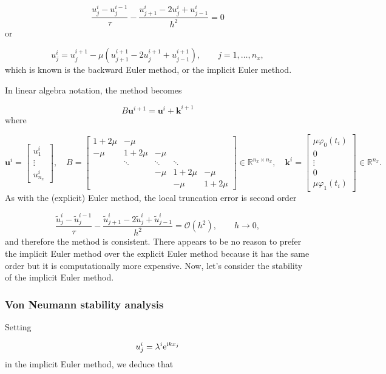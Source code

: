 \documentclass[12pt,landscape]{article}
\begin{document}
{\[
\frac{u^{i}_j - u^{i-1}_j}{\tau} - \frac{u^{i}_{j+1} - 2u^i_j + u^i_{j-1}}{h^2} = 0
\]
or

\[
u^{i}_j = u^{i+1}_j - \mu \left( u^{i+1}_{j+1} - 2u^{i+1}_j + u^{i+1}_{j-1}  \right), \qquad j = 1, \ldots, n_x,
\]
which is known is the backward Euler method, or the implicit Euler method.

In linear algebra notation, the method becomes

\[
B\mathbf{u}^{i+1} = \mathbf{u}^i + \mathbf{k}^{i+1}
\]
where

\[
\mathbf{u}^i = \begin{bmatrix}
u^{i}_{1} \\
\vdots \\
u^{i}_{n_x}
\end{bmatrix}, \quad  B = \begin{bmatrix}
1 + 2\mu & -\mu & & & \\
-\mu  & 1+2\mu & -\mu  & & \\
      & \ddots & \ddots & \ddots & \\
      &        & -\mu    & 1+ 2\mu & -\mu \\
      &        &        &-\mu      & 1+2\mu
\end{bmatrix} \in \mathbb{R}^{n_x \times n_x}, \quad \mathbf{k}^i=
\begin{bmatrix}
\mu\varphi_0(t_i) \\
0 \\
\vdots \\
0 \\
\mu \varphi_1(t_i)
\end{bmatrix} \in \mathbb{R}^{n_x}.
\]
As with the (explicit) Euler method, the local truncation error is second order

\[
\frac{\tilde{u}^{i}_j - \tilde{u}^{i-1}_j}{\tau} - \frac{\tilde{u}^{i}_{j+1} - 2\tilde{u}^i_j + \tilde{u}^i_{j-1}}{h^2} =  \mathcal{O}(h^2), \qquad h \to 0,
\]
and therefore the method is consistent.  There appears to be no reason to prefer the implicit Euler method over the explicit Euler method because it has the same order but it is computationally more expensive.   Now, let's consider the stability of the implicit Euler method. 

\subsubsection{Von Neumann stability analysis}
Setting

\[
u^i_j = \lambda^i{\rm e}^{{\rm i}k x_j}
\]
in the implicit Euler method, we deduce that


}
\end{document}
